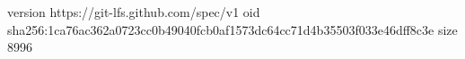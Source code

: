 version https://git-lfs.github.com/spec/v1
oid sha256:1ca76ac362a0723cc0b49040fcb0af1573dc64cc71d4b35503f033e46dff8c3e
size 8996
